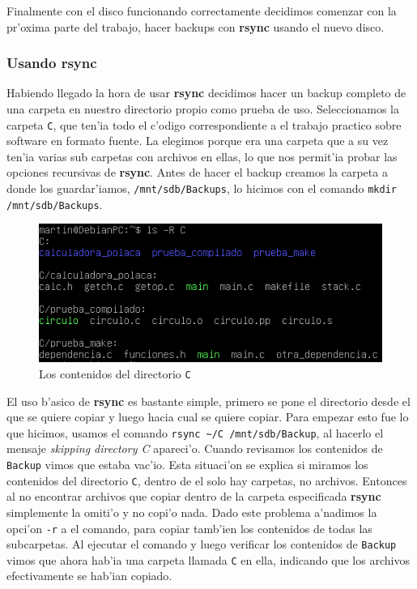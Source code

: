 \documentclass[11pt]{article}
\newcommand{\rsync}[0]{\textbf{rsync}}
\newcommand{\backup}[0]{\texttt{Backup}}
\begin{document}
		Finalmente con el disco funcionando correctamente decidimos comenzar con la pr'oxima parte del trabajo, hacer backups con \rsync{} usando el nuevo disco.

	\subsubsection{Usando rsync}
		Habiendo llegado la hora de usar \rsync{} decidimos hacer un backup completo de una carpeta en nuestro directorio propio como prueba de uso. Seleccionamos la carpeta \texttt{C}, que ten'ia todo el c'odigo correspondiente a el trabajo practico sobre software en formato fuente. La elegimos porque era una carpeta que a su vez ten'ia varias sub carpetas con archivos en ellas, lo que nos permit'ia probar las opciones recursivas de \rsync{}. Antes de hacer el backup creamos la carpeta a donde los guardar'iamos, \texttt{/mnt/sdb/Backups}, lo hicimos con el comando \texttt{mkdir /mnt/sdb/Backups}.

		\begin{figure}[H]
    			\centering
    			\includegraphics[scale=0.80]{Images/rsync/rsync_backup_C_contents.PNG}
    			\caption{Los contenidos del directorio \texttt{C}}
    			\label{fig:rsync_C_contents}
		\end{figure}

		El uso b'asico de \rsync{} es bastante simple, primero se pone el directorio desde el que se quiere copiar y luego hacia cual se quiere copiar. Para empezar esto fue lo que hicimos, usamos el comando \texttt{rsync \textasciitilde/C /mnt/sdb/Backup}, al hacerlo el mensaje \textit{skipping directory C} apareci'o. Cuando revisamos los contenidos de \backup{} vimos que estaba vac'io. Esta situaci'on se explica si miramos los contenidos del directorio \texttt{C}, dentro de el solo hay carpetas, no archivos. Entonces al no encontrar archivos que copiar dentro de la carpeta especificada \rsync{} simplemente la omiti'o y no copi'o nada. Dado este problema a'nadimos la opci'on \texttt{-r} a el comando,  para copiar tamb'ien los contenidos de todas las subcarpetas. Al ejecutar el comando y luego verificar los contenidos de \backup{} vimos que ahora hab'ia una carpeta llamada \texttt{C} en ella, indicando que los archivos efectivamente se hab'ian copiado.
\end{document}
